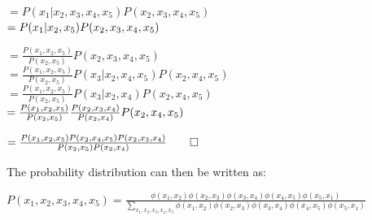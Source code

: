 \documentclass[12pt]{article}
\begin{document}
$= P(x_1 \vert x_2, x_3, x_4, x_5)P(x_2, x_3, x_4, x_5)$\\

$= P(x_1 \vert x_2, x_5)P(x_2, x_3, x_4, x_5)\\$

$= \frac{P(x_1, x_2, x_5)}{P(x_2, x_5)}P(x_2, x_3, x_4, x_5)$\\

$= \frac{P(x_1, x_2, x_5)}{P(x_2, x_5)}P(x_3 \vert x_2, x_4, x_5)P(x_2, x_4, x_5)$\\

$= \frac{P(x_1, x_2, x_5)}{P(x_2, x_5)}P(x_3 \vert x_2, x_4)P(x_2, x_4, x_5)$\\

$= \frac{P(x_1, x_2, x_5)}{P(x_2, x_5)}\frac{P(x_2, x_3, x_4)}{P(x_2, x_4)}P(x_2, x_4, x_5)\\$

$= \frac{P(x_1, x_2, x_5)P(x_2, x_4, x_5)P(x_2, x_3, x_4)}{P(x_2, x_5)P(x_2, x_4)}\qed\\$

The probability distribution can then be written as:

$P(x_1, x_2, x_3, x_4, x_5) = \frac{\phi(x_1, x_2)\phi(x_2, x_3)\phi(x_3, x_4)\phi(x_4, x_5)\phi(x_5, x_1)}{\sum_{x_1, x_2, x_3, x_4, x_5} \phi(x_1, x_2)\phi(x_2, x_3)\phi(x_3, x_4)\phi(x_4, x_5)\phi(x_5, x_1)}$
\end{document}
